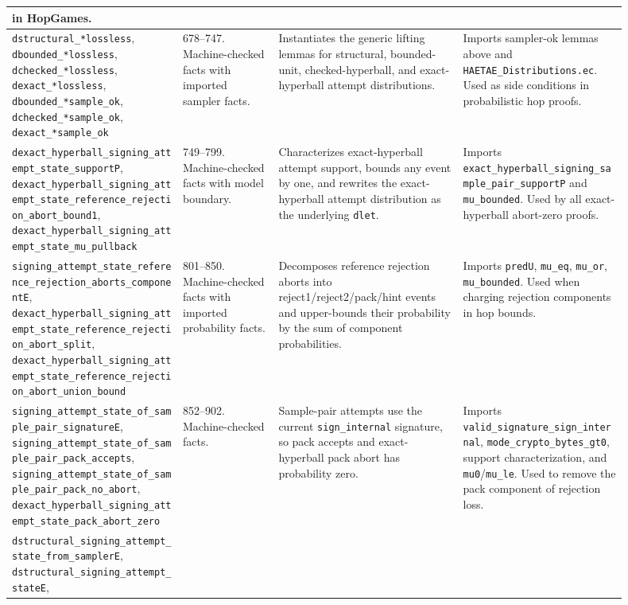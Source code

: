 \documentclass[11pt]{report}
\DeclareRobustCommand{\file}[1]{\ifmmode\text{\nolinkurl{#1}}\else\nolinkurl{#1}\fi}
\DeclareRobustCommand{\ec}[1]{\ifmmode\text{\nolinkurl{#1}}\else\nolinkurl{#1}\fi}
\theoremstyle{definition}
\theoremstyle{plain}
\begin{document}
{\begin{longtable}{p{0.25\linewidth}p{0.14\linewidth}p{0.27\linewidth}p{0.24\linewidth}}
in HopGames. \\
\midrule
\ec{dstructural\_*lossless},
\ec{dbounded\_*lossless},
\ec{dchecked\_*lossless},
\ec{dexact\_*lossless},
\ec{dbounded\_*sample\_ok},
\ec{dchecked\_*sample\_ok},
\ec{dexact\_*sample\_ok} &
678--747. Machine-checked facts with imported sampler facts. &
Instantiates the generic lifting lemmas for structural, bounded-unit,
checked-hyperball, and exact-hyperball attempt distributions. &
Imports sampler-ok lemmas above and \file{HAETAE\_Distributions.ec}.  Used as
side conditions in probabilistic hop proofs. \\
\midrule
\ec{dexact\_hyperball\_signing\_attempt\_state\_supportP},
\ec{dexact\_hyperball\_signing\_attempt\_state\_reference\_rejection\_abort\_bound1},
\ec{dexact\_hyperball\_signing\_attempt\_state\_mu\_pullback} &
749--799. Machine-checked facts with model boundary. &
Characterizes exact-hyperball attempt support, bounds any event by one, and
rewrites the exact-hyperball attempt distribution as the underlying \ec{dlet}. &
Imports \ec{exact\_hyperball\_signing\_sample\_pair\_supportP} and
\ec{mu\_bounded}.  Used by all exact-hyperball abort-zero proofs. \\
\midrule
\ec{signing\_attempt\_state\_reference\_rejection\_aborts\_componentE},
\ec{dexact\_hyperball\_signing\_attempt\_state\_reference\_rejection\_abort\_split},
\ec{dexact\_hyperball\_signing\_attempt\_state\_reference\_rejection\_abort\_union\_bound} &
801--850. Machine-checked facts with imported probability facts. &
Decomposes reference rejection aborts into reject1/reject2/pack/hint events
and upper-bounds their probability by the sum of component probabilities. &
Imports \ec{predU}, \ec{mu\_eq}, \ec{mu\_or}, \ec{mu\_bounded}.  Used when
charging rejection components in hop bounds. \\
\midrule
\ec{signing\_attempt\_state\_of\_sample\_pair\_signatureE},
\ec{signing\_attempt\_state\_of\_sample\_pair\_pack\_accepts},
\ec{signing\_attempt\_state\_of\_sample\_pair\_pack\_no\_abort},
\ec{dexact\_hyperball\_signing\_attempt\_state\_pack\_abort\_zero} &
852--902. Machine-checked facts. &
Sample-pair attempts use the current \ec{sign\_internal} signature, so pack
accepts and exact-hyperball pack abort has probability zero. &
Imports \ec{valid\_signature\_sign\_internal}, \ec{mode\_crypto\_bytes\_gt0},
support characterization, and \ec{mu0}/\ec{mu\_le}.  Used to remove the pack
component of rejection loss. \\
\midrule
\ec{dstructural\_signing\_attempt\_state\_from\_samplerE},
\ec{dstructural\_signing\_attempt\_stateE},

\end{longtable}}
\end{document}
